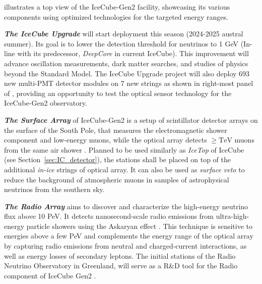  illustrates a top view of the IceCube-Gen2 facility, showcasing its various components using optimized technologies for the targeted energy ranges. 

\begin{description}
    \item \textbf{\emph{The IceCube Upgrade}} will start deployment this season (2024-2025 austral summer). Its goal is to lower the detection threshold for neutrinos to 1 GeV (In-line with its predecessor, \emph{DeepCore} in current IceCube). This improvement will advance oscillation measurements, dark matter searches, and studies of physics beyond the Standard Model. The IceCube Upgrade project will also deploy 693 new multi-PMT detector modules on 7 new strings as shown in right-most panel of , providing an opportunity to test the optical sensor technology for the IceCube-Gen2 observatory.

    \item \textbf{\emph{The Surface Array}} of IceCube-Gen2 is a setup of scintillator detector arrays on the surface of the South Pole, that measures the electromagnetic shower component and low-energy muons, while the optical array detects $\geq \mathrm{TeV}$ muons from the same air shower . Planned to be used similarly as \emph{IceTop} of IceCube (see Section~\ref{sec:IC_detector}), the stations shall be placed on top of the additional \emph{in-ice} strings of optical array. It can also be used as \emph{surface veto} to reduce the background of atmospheric muons in samples of astrophysical neutrinos from the southern sky.

    \item \textbf{\emph{The Radio Array}} aims to discover and characterize the high-energy neutrino flux above 10 PeV. It detects nanosecond-scale radio emissions from ultra-high-energy particle showers using the Askaryan effect . This technique is sensitive to energies above a few PeV and complements the energy range of the optical array by capturing radio emissions from neutral and charged-current interactions, as well as energy losses of secondary leptons. The initial stations of the Radio Neutrino Observatory in Greenland, will serve as a R\&D tool for the Radio component of IceCube Gen2 .


\end{description}
